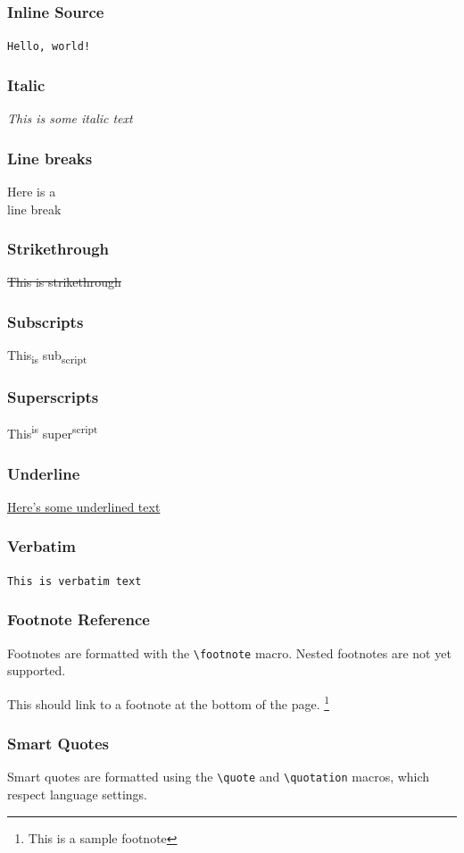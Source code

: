 \documentclass[11pt]{article}
\begin{document}
\subsubsection{Inline Source}
\label{sec:orgbf5b4ec}
\texttt{Hello, world!}
\subsubsection{Italic}
\label{sec:org5af85e8}
\emph{This is some italic text}
\subsubsection{Line breaks}
\label{sec:org4540601}
Here is a\\
line break
\subsubsection{Strikethrough}
\label{sec:orgb695a9d}
\sout{This is strikethrough}
\subsubsection{Subscripts}
\label{sec:org14ec1b2}
This\textsubscript{is} sub\textsubscript{script}
\subsubsection{Superscripts}
\label{sec:orge9a6e31}
This\textsuperscript{is} super\textsuperscript{script}
\subsubsection{Underline}
\label{sec:org33c3e07}
\uline{Here's some underlined text}
\subsubsection{Verbatim}
\label{sec:org6e48cee}
\texttt{This is verbatim text}
\subsubsection{Footnote Reference}
\label{sec:org03c8ba9}
Footnotes are formatted with the \texttt{\textbackslash{}footnote} macro. Nested footnotes are
not yet supported.

This should link to a footnote at the bottom of the page. \footnote{This is a sample footnote} 
\subsubsection{Smart Quotes}
\label{sec:orgd403324}
Smart quotes are formatted using the \texttt{\textbackslash{}quote} and \texttt{\textbackslash{}quotation} macros,
which respect language settings.
\end{document}
